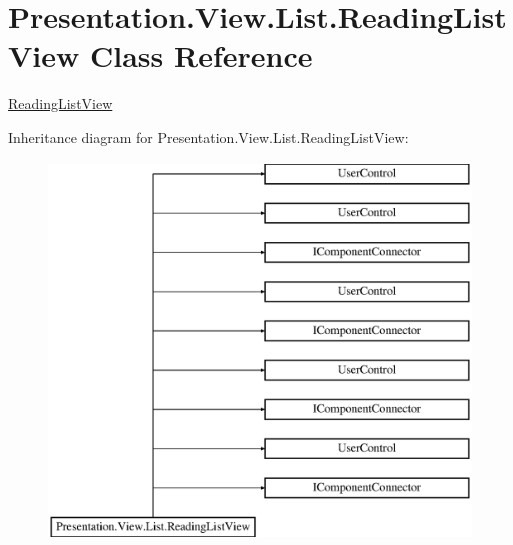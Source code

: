 \hypertarget{class_presentation_1_1_view_1_1_list_1_1_reading_list_view}{}\section{Presentation.\+View.\+List.\+Reading\+List\+View Class Reference}
\label{class_presentation_1_1_view_1_1_list_1_1_reading_list_view}


\hyperlink{class_presentation_1_1_view_1_1_list_1_1_reading_list_view}{Reading\+List\+View}  


Inheritance diagram for Presentation.\+View.\+List.\+Reading\+List\+View\+:\begin{figure}[H]
\begin{center}
\leavevmode
\includegraphics[height=10.000000cm]{class_presentation_1_1_view_1_1_list_1_1_reading_list_view}
\end{center}
\end{figure}
